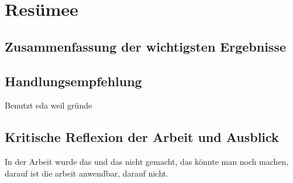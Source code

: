 \section{Resümee}
\subsection{Zusammenfassung der wichtigsten Ergebnisse}


\subsection{Handlungsempfehlung}
Benutzt eda weil gründe
\subsection{Kritische Reflexion der Arbeit und Ausblick}
In der Arbeit wurde das und das nicht gemacht,
 das könnte man noch machen,
 darauf ist die arbeit anwendbar, 
 darauf nicht.
